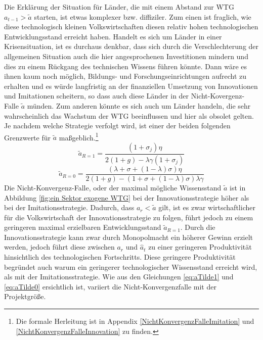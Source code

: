 %
Die Erklärung der Situation für Länder, die mit einem Abstand zur WTG $a_{t-1}>\tilde{a}$ starten, ist etwas komplexer bzw. diffiziler. Zum einen ist fraglich, wie diese technologisch kleinen Volkswirtschaften diesen relativ hohen technologischen Entwicklungsstand erreicht haben. Handelt es sich um Länder in einer Krisensituation, ist es durchaus denkbar, dass sich durch die Verschlechterung der allgemeinen Situation auch die hier angesprochenen Investitionen mindern und dies zu einem Rückgang des technischen Wissens führen könnte. Dann wäre es ihnen kaum noch möglich, Bildungs- und Forschungseinrichtungen aufrecht zu erhalten und es würde  langfristig an der finanziellen Umsetzung von Innovationen und Imitationen scheitern, so dass auch diese Länder in der Nicht-Kovergenz-Falle $\tilde{a}$ münden. Zum anderen könnte es sich auch um Länder handeln, die sehr wahrscheinlich das Wachstum der WTG beeinflussen und hier als obsolet gelten.\\
%
Je nachdem welche Strategie verfolgt wird, ist einer der beiden folgenden Grenzwerte für $\tilde{a}$ maßgeblich.\footnote{Die formale Herleitung ist in Appendix \ref{NichtKonvergenzFalleImitation} und \ref{NichtKonvergenzFalleInnovation} zu finden.}
%
	\begin{equation}
		\tilde{a}_{R=1}=\frac{(1+\sigma_j)\eta}{2(1+g)-\lambda\gamma(1+\sigma_j)}\label{eq:aTilde1}
	\end{equation}
%
	\begin{equation}
		\tilde{a}_{R=0} = \frac{(\lambda+\sigma+(1-\lambda)\sigma)\eta}{2(1+g)-(1+\sigma+(1-\lambda)\sigma)\lambda\gamma}\label{eq:aTilde0}
	\end{equation}
%
Die Nicht-Konvergenz-Falle, oder der maximal mögliche Wissensstand $\tilde{a}$ ist in Abbildung \ref{fig:ein Sektor exogene WTG} bei der Innovationsstrategie höher als bei der Imitationsstrategie. Dadurch, dass $a_r<\tilde{a}$ gilt, ist es zwar wirtschaftlicher für die Volkswirtschaft der Innovationsstrategie zu folgen, führt jedoch zu einem geringeren maximal erzielbaren Entwicklungsstand $\tilde{a}_{R=1}$. Durch die Innovationsstrategie kann zwar durch Monopolmacht ein höherer Gewinn erzielt werden, jedoch führt diese zwischen $a_r$ und $\hat{a}_t$ zu einer geringeren Produktivität hinsichtlich des technologischen Fortschritts. Diese geringere Produktivität begründet auch warum ein geringerer technologischer Wissensstand erreicht wird, als mit der Imitationsstrategie. 
%
Wie aus den Gleichungen \ref{eq:aTilde1} und \ref{eq:aTilde0} ersichtlich ist, variiert die Nicht-Konvergenzfalle mit der Projektgröße.
\newpage
